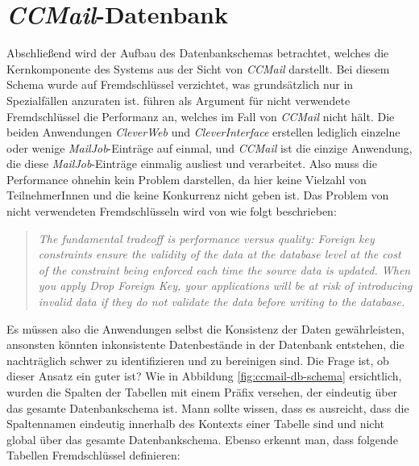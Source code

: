 \section{\emph{CCMail}-Datenbank}
\label{sec:ccmail-datanbank}
Abschließend wird der Aufbau des Datenbankschemas betrachtet, welches die Kernkomponente des Systems aus der Sicht von \emph{CCMail} darstellt. Bei diesem Schema wurde auf Fremdschlüssel verzichtet, was grundsätzlich nur in Spezialfällen anzuraten ist.
\newline
\newline 
\cite[213]{refactoreDatabase} führen als Argument für nicht verwendete Fremdschlüssel die Performanz an, welches im Fall von \emph{CCMail} nicht hält. Die beiden Anwendungen \emph{CleverWeb} und \emph{CleverInterface} erstellen lediglich einzelne oder wenige \emph{MailJob}-Einträge auf einmal, und \emph{CCMail} ist die einzige Anwendung, die diese \emph{MailJob}-Einträge einmalig ausliest und verarbeitet. Also muss die Performance ohnehin kein Problem darstellen, da hier keine Vielzahl von TeilnehmerInnen und die keine Konkurrenz nicht geben ist. Das Problem von nicht verwendeten Fremdschlüsseln wird von \cite[213]{refactoreDatabase} wie folgt beschrieben:
\newpage
\begin{quote}
\emph{The fundamental tradeoff is performance versus quality: Foreign key constraints ensure the validity of the data at the database level at the cost of the constraint being enforced each time the source data is updated. When you apply Drop Foreign Key, your applications will be at risk of introducing invalid data if they do not validate the data before writing to the database.}
\end{quote}
Es müssen also die Anwendungen selbst die Konsistenz der Daten gewährleisten, ansonsten könnten inkonsistente Datenbestände in der Datenbank entstehen, die nachträglich schwer zu identifizieren und zu bereinigen sind. Die Frage ist, ob dieser Ansatz ein guter ist?
\newline
\newline
Wie in Abbildung \ref{fig:ccmail-db-schema} ersichtlich, wurden die Spalten der Tabellen mit einem Präfix versehen, der eindeutig über das gesamte Datenbankschema ist. Mann sollte wissen, dass es ausreicht, dass die Spaltennamen eindeutig innerhalb des Kontexts einer Tabelle sind und nicht global über das gesamte Datenbankschema. Ebenso erkennt man, dass folgende Tabellen Fremdschlüssel definieren: 
